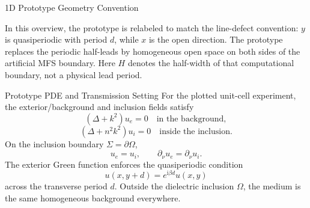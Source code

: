 \documentclass[aspectratio=169]{beamer}
\newcommand{\ii}{\mathrm{i}}
\begin{document}
\begin{frame}{1D Prototype Geometry Convention}
  \centering

  \vspace{0.4em}
  \small
  In this overview, the prototype is relabeled to match the line-defect
  convention: \(y\) is quasiperiodic with period \(d\), while \(x\) is the
  open direction. The prototype replaces the periodic half-leads by
  homogeneous open space on both sides of the artificial MFS boundary. Here
  \(H\) denotes the half-width of that computational boundary, not a physical
  lead period.
\end{frame}

\begin{frame}{Prototype PDE and Transmission Setting}
  For the plotted unit-cell experiment, the exterior/background and
  inclusion fields satisfy
  \[
    (\Delta+k^2)u_e=0
    \quad\text{in the background},
  \]
  \[
    (\Delta+n^2k^2)u_i=0
    \quad\text{inside the inclusion}.
  \]
  On the inclusion boundary \(\Sigma=\partial\Omega\),
  \[
    u_e=u_i,
    \qquad
    \partial_\nu u_e=\partial_\nu u_i.
  \]
  The exterior Green function enforces the quasiperiodic condition
  \[
    u(x,y+d)=e^{\ii\beta d}u(x,y)
  \]
  across the transverse period \(d\). Outside the dielectric inclusion
  \(\Omega\), the medium is the same homogeneous background everywhere.
\end{frame}
\end{document}
